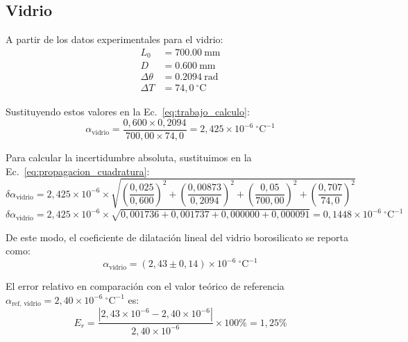 \subsection{Vidrio}

A partir de los datos experimentales para el vidrio:
\begin{align*}
    L_0 &= \qty{700,00}{\milli\meter} \\
    D &= \qty{0,600}{\milli\meter} \\
    \Delta\theta &= \qty{0,2094}{\radian} \\
    \Delta T &= 74{,}0\ ^\circ\text{C}
\end{align*}

Sustituyendo estos valores en la Ec.~\eqref{eq:trabajo_calculo}:
\begin{equation*}
    \alpha_{\text{vidrio}} = \frac{0{,}600 \times 0{,}2094}{700{,}00 \times 74{,}0} = 2{,}425 \times 10^{-6}\ ^\circ\text{C}^{-1}
\end{equation*}

Para calcular la incertidumbre absoluta, sustituimos en la Ec.~\eqref{eq:propagacion_cuadratura}:
\begin{equation*}
    \delta\alpha_{\text{vidrio}} = 2{,}425 \times 10^{-6} \times \sqrt{
        \left(\frac{0{,}025}{0{,}600}\right)^2 +
        \left(\frac{0{,}00873}{0{,}2094}\right)^2 +
        \left(\frac{0{,}05}{700{,}00}\right)^2 +
        \left(\frac{0{,}707}{74{,}0}\right)^2
    }
\end{equation*}
\begin{equation*}
    \delta\alpha_{\text{vidrio}} = 2{,}425 \times 10^{-6} \times \sqrt{
        0{,}001736 + 0{,}001737 + 0{,}000000 + 0{,}000091
    } = 0{,}1448 \times 10^{-6}\ ^\circ\text{C}^{-1}
\end{equation*}

De este modo, el coeficiente de dilatación lineal del vidrio borosilicato se reporta como:
\begin{equation}
    \alpha_{\text{vidrio}} = (2{,}43 \pm 0{,}14) \times 10^{-6}\ ^\circ\text{C}^{-1}
    \label{eq:res_vidrio}
\end{equation}

El error relativo en comparación con el valor teórico de referencia $\alpha_{\text{ref, vidrio}} = 2{,}40 \times 10^{-6}\ ^\circ\text{C}^{-1}$ es:
\begin{equation*}
    E_r = \frac{|2{,}43 \times 10^{-6} - 2{,}40 \times 10^{-6}|}{2{,}40 \times 10^{-6}} \times 100\% = 1{,}25\%
\end{equation*}
